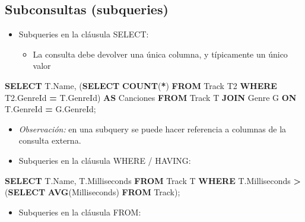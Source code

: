 \documentclass[
]{book}
\newenvironment{Shaded}{\begin{snugshade}}{\end{snugshade}}
\newcommand{\FunctionTok}[1]{\textcolor[rgb]{0.13,0.29,0.53}{\textbf{#1}}}
\newcommand{\KeywordTok}[1]{\textcolor[rgb]{0.13,0.29,0.53}{\textbf{#1}}}
\newcommand{\NormalTok}[1]{#1}
\newcommand{\OperatorTok}[1]{\textcolor[rgb]{0.81,0.36,0.00}{\textbf{#1}}}
\providecommand{\tightlist}{%
  \setlength{\itemsep}{0pt}\setlength{\parskip}{0pt}}
\theoremstyle{break}
\theoremstyle{nonumberplain}
\begin{document}
\subsection{Subconsultas (subqueries)}\label{subconsultas-subqueries}

\begin{itemize}
\item
  Subqueries en la cláusula SELECT:

  \begin{itemize}
  \tightlist
  \item
    La consulta debe devolver una única columna, y típicamente un único valor
  \end{itemize}
\end{itemize}

\begin{Shaded}
\begin{Highlighting}[]
  \KeywordTok{SELECT}\NormalTok{ T.Name, (}\KeywordTok{SELECT} \FunctionTok{COUNT}\NormalTok{(}\OperatorTok{*}\NormalTok{) }
                  \KeywordTok{FROM}\NormalTok{ Track T2 }
                  \KeywordTok{WHERE}\NormalTok{ T2.GenreId }\OperatorTok{=}\NormalTok{ T.GenreId) }\KeywordTok{AS}\NormalTok{ Canciones }
  \KeywordTok{FROM}\NormalTok{ Track T }\KeywordTok{JOIN}\NormalTok{ Genre G }\KeywordTok{ON}\NormalTok{ T.GenreId }\OperatorTok{=}\NormalTok{ G.GenreId; }
\end{Highlighting}
\end{Shaded}

\begin{itemize}
\item
  \emph{Observación:} en una subquery se puede hacer referencia a columnas de la consulta externa.
\item
  Subqueries en la cláusula WHERE / HAVING:
\end{itemize}

\begin{Shaded}
\begin{Highlighting}[]
  \KeywordTok{SELECT}\NormalTok{ T.Name, T.Milliseconds }
  \KeywordTok{FROM}\NormalTok{ Track T }
  \KeywordTok{WHERE}\NormalTok{ T.Milliseconds }\OperatorTok{\textgreater{}}\NormalTok{ (}\KeywordTok{SELECT} \FunctionTok{AVG}\NormalTok{(Milliseconds) }\KeywordTok{FROM}\NormalTok{ Track);  }
\end{Highlighting}
\end{Shaded}

\begin{itemize}
\tightlist
\item
  Subqueries en la cláusula FROM:
\end{itemize}
\end{document}
